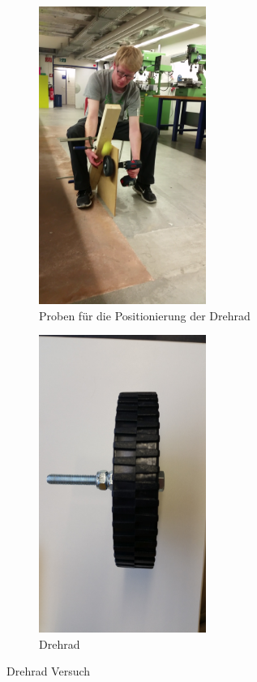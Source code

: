 \begin{figure}[h!]
	\centering
	\begin{subfigure}{.4\textwidth}
		\centering
		\includegraphics[width=0.6\textwidth]{../../fig/Versuch_Drehrad.png}
		\caption{Proben für die Positionierung der Drehrad}
		\label{fig:Aufbau der Versuch}
	\end{subfigure} %
	\begin{subfigure}{.4\textwidth}
		\centering
		\includegraphics[width=0.6\textwidth]{../../fig/Drehrad_1.jpg}
		\caption{Drehrad}
		\label{fig:Drehrad}
	\end{subfigure}
	\caption{Drehrad Versuch}
	\label{Drehrad Versuch}
\end{figure}
